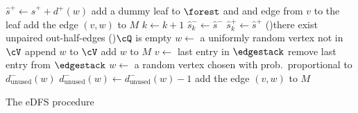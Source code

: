 \begin{algorithm}[htbp]
{{            $\hat{s}^+ \leftarrow \hat{s}^+ + d^+(w)$ \;
        }{
            add a dummy leaf to $\forest$ and and edge from $v$ to the leaf  \;
            add the edge $(v, w)$ to $M$\;
        }
        $k \leftarrow k + 1$ \;
        $\hat{s}^-_k \leftarrow \hat{s}^-$ \;
        $\hat{s}^+_k \leftarrow \hat{s}^+$ \;
    }
    \While(){there exist unpaired out-half-edges}{
    \eIf(){$\cQ$ is empty}
    {$w\leftarrow$ a uniformly random vertex not in $\cV$\;
    append $w$ to $\cV$\;
    add $w$ to $M$\;}
    {$v \leftarrow$ last entry in $\edgestack$ \;
            remove last entry from $\edgestack$ \;
            $w \leftarrow$ a random vertex chosen with prob.\ proportional to $d^-_{\mathrm{unused}}(w)$\;
            $d^-_{\mathrm{unused}}(w)\leftarrow d^-_{\mathrm{unused}}(w)-1$ \;
            add the edge $(v,w)$ to $M$\;
    }
    }
    
    \caption{The eDFS procedure \label{alg:edfs}}
\end{algorithm}